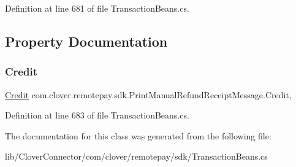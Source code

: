 Definition at line 681 of file Transaction\+Beans.\+cs.



\subsection{Property Documentation}
\mbox{\label{classcom_1_1clover_1_1remotepay_1_1sdk_1_1_print_manual_refund_receipt_message_a93514623c2763a437652ce93fc59f07f}} 
\subsubsection{\texorpdfstring{Credit}{Credit}}
{\footnotesize\ttfamily \hyperlink{classcom_1_1clover_1_1sdk_1_1v3_1_1payments_1_1_credit}{Credit} com.\+clover.\+remotepay.\+sdk.\+Print\+Manual\+Refund\+Receipt\+Message.\+Credit\hspace{0.3cm}{\ttfamily [get]}, {\ttfamily [set]}}



Definition at line 683 of file Transaction\+Beans.\+cs.



The documentation for this class was generated from the following file\+:\begin{DoxyCompactItemize}
\item 
lib/\+Clover\+Connector/com/clover/remotepay/sdk/Transaction\+Beans.\+cs\end{DoxyCompactItemize}
